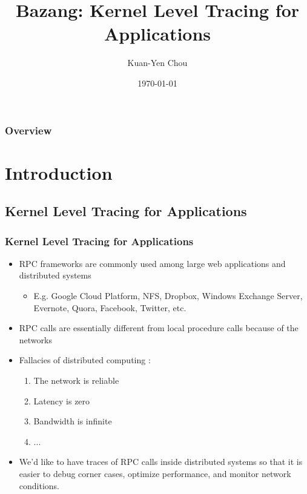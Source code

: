 \documentclass[10pt]{beamer}
\title[Bazang: Kernel Level Tracing for Applications]{Bazang: Kernel Level Tracing for Applications}
\author{Kuan-Yen Chou}
\institute[UIUC] {
    University of Illinois at Urbana-Champaign \\ %
    \medskip
    \textit{kychou2@illinois.edu} %
}
\date{\today} %
\begin{document}
\begin{frame}
\titlepage %
\end{frame}

\begin{frame}
\frametitle{Overview} %
\begin{NoHyper}
\tableofcontents
\end{NoHyper}
\end{frame}


\section{Introduction}


\subsection{Kernel Level Tracing for Applications}
\begin{frame}
\frametitle{Kernel Level Tracing for Applications}
\begin{itemize}
    \item RPC frameworks are commonly used among large web applications and
          distributed systems
          \begin{itemize}
              \item E.g. Google Cloud Platform, NFS, Dropbox, Windows Exchange
                    Server, Evernote, Quora, Facebook, Twitter, etc.
          \end{itemize}
    \item RPC calls are essentially different from local procedure calls because
          of the networks
    \item Fallacies of distributed computing \cite{deutsch1994, arnon}:
          \begin{enumerate}
              \item The network is reliable
              \item Latency is zero
              \item Bandwidth is infinite
              \item ...
          \end{enumerate}
    \item We'd like to have traces of RPC calls inside distributed systems so
          that it is easier to debug corner cases, optimize performance, and
          monitor network conditions.
\end{itemize}
\end{frame}
\end{document}
